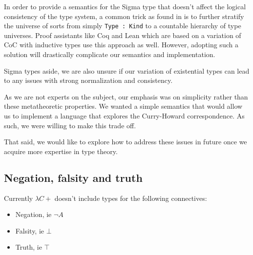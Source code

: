 \documentclass{article}
\begin{document}

In order to provide a semantics for the Sigma type that doesn't affect the logical
consistency of the type system, a common trick as found in \cite{extended_coc}
is to further stratify the universe of sorts from simply \texttt{Type : Kind} to 
a countable hierarchy of type universes.
Proof assistants like Coq and Lean which are based on a variation of CoC with
inductive types use this approach as well.
However, adopting such a solution will drastically complicate our semantics and
implementation. 

Sigma types aside, we are also unsure if our variation of existential types
can lead to any issues with strong normalization and consistency.

As we are not experts on the subject, our emphasis was on simplicity rather than
these metatheoretic properties.
We wanted a simple semantics that would allow us to implement a language that
explores the Curry-Howard correspondence.
As such, we were willing to make this trade off.

That said, we would like to explore how to address these issues in future once
we acquire more expertise in type theory.



\subsection{Negation, falsity and truth}
Currently $\lambda C+$ doesn't include types for the following connectives:
\begin{itemize}[label=$\ast$]
  \item Negation, ie $\neg A$
  \item Falsity, ie $\bot$
  \item Truth, ie $\top$ 
\end{itemize} 
\end{document}
